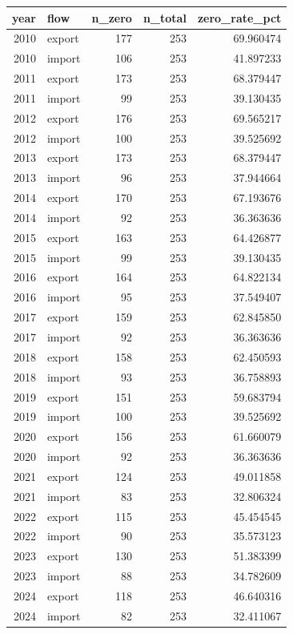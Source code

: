 \begin{tabular}{rlrrr}
\toprule
year & flow & n_zero & n_total & zero_rate_pct \\
\midrule
2010 & export & 177 & 253 & 69.960474 \\
2010 & import & 106 & 253 & 41.897233 \\
2011 & export & 173 & 253 & 68.379447 \\
2011 & import & 99 & 253 & 39.130435 \\
2012 & export & 176 & 253 & 69.565217 \\
2012 & import & 100 & 253 & 39.525692 \\
2013 & export & 173 & 253 & 68.379447 \\
2013 & import & 96 & 253 & 37.944664 \\
2014 & export & 170 & 253 & 67.193676 \\
2014 & import & 92 & 253 & 36.363636 \\
2015 & export & 163 & 253 & 64.426877 \\
2015 & import & 99 & 253 & 39.130435 \\
2016 & export & 164 & 253 & 64.822134 \\
2016 & import & 95 & 253 & 37.549407 \\
2017 & export & 159 & 253 & 62.845850 \\
2017 & import & 92 & 253 & 36.363636 \\
2018 & export & 158 & 253 & 62.450593 \\
2018 & import & 93 & 253 & 36.758893 \\
2019 & export & 151 & 253 & 59.683794 \\
2019 & import & 100 & 253 & 39.525692 \\
2020 & export & 156 & 253 & 61.660079 \\
2020 & import & 92 & 253 & 36.363636 \\
2021 & export & 124 & 253 & 49.011858 \\
2021 & import & 83 & 253 & 32.806324 \\
2022 & export & 115 & 253 & 45.454545 \\
2022 & import & 90 & 253 & 35.573123 \\
2023 & export & 130 & 253 & 51.383399 \\
2023 & import & 88 & 253 & 34.782609 \\
2024 & export & 118 & 253 & 46.640316 \\
2024 & import & 82 & 253 & 32.411067 \\
\bottomrule
\end{tabular}
